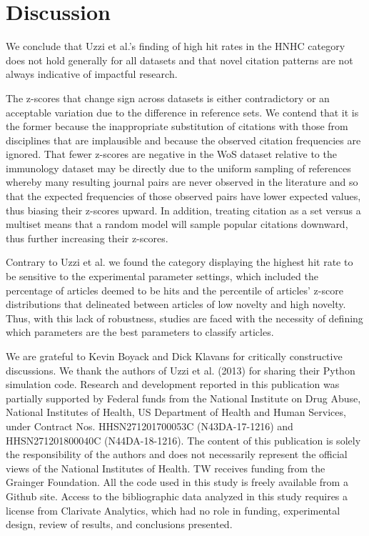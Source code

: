 \documentclass[NETN]{stjour}
\begin{document}
\section{Discussion}

We conclude that Uzzi et al.'s finding of high hit rates in the HNHC category does not hold generally for all datasets and that novel citation patterns are not always indicative of impactful research.

The z-scores that change sign across datasets is either contradictory or an acceptable variation due to the difference in reference sets. We contend that it is the former because the inappropriate substitution of citations with those from disciplines that are implausible and because the observed citation frequencies are ignored. That fewer z-scores are negative in the WoS dataset relative to the immunology dataset may be directly due to the uniform sampling of references whereby many resulting journal pairs are never observed in the literature and so that the expected frequencies of those observed pairs have lower expected values, thus biasing their z-scores upward. In addition, treating citation as a set versus a multiset means that a random model will sample popular citations downward, thus further increasing their z-scores.

Contrary to Uzzi et al. we found the category displaying the highest hit rate to be sensitive to the experimental parameter settings, which included the percentage of articles deemed to be hits and the percentile of articles' z-score distributions that delineated between articles of low novelty and high novelty. Thus, with this lack of robustness, studies are faced with the necessity of defining which parameters are the best parameters to classify articles.

\acknowledgments
We are grateful to Kevin Boyack and Dick Klavans for critically constructive discussions. We thank the authors of Uzzi et al. (2013) for sharing their Python simulation code. Research and development reported in this publication was partially supported by Federal funds from the National Institute on Drug Abuse, National Institutes of Health, US Department of Health and Human Services, under Contract Nos. HHSN271201700053C (N43DA-17-1216) and HHSN271201800040C (N44DA-18-1216). The content of this publication is solely the responsibility of the authors and does not necessarily represent the official views of the National Institutes of Health. TW receives funding from the Grainger Foundation. All the code used in this study is freely available from a Github site. Access to the bibliographic data analyzed in this study requires a license from Clarivate Analytics, which had no role in funding, experimental design, review of results, and conclusions presented. 
\end{document}
